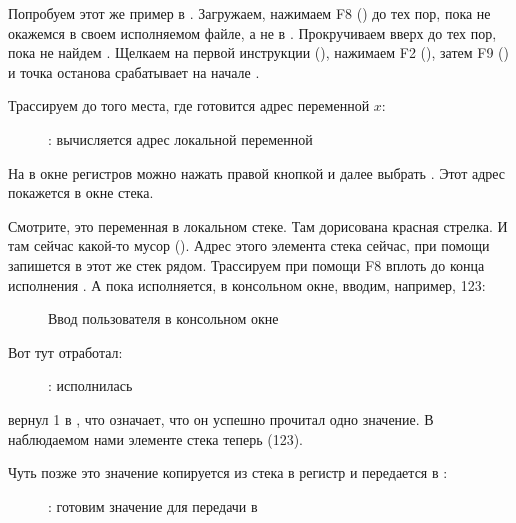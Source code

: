 \clearpage
{}
\myindex{\olly}

Попробуем этот же пример в \olly.
Загружаем, нажимаем F8 (\stepover) до тех пор, пока не окажемся в своем исполняемом файле,
а не в .
Прокручиваем вверх до тех пор, пока не найдем \main.
Щелкаем на первой инструкции (), нажимаем F2 (), 
затем F9 () и точка останова срабатывает на начале \main.

Трассируем до того места, где готовится адрес переменной $x$:

\begin{figure}[H]
\centering
{}
\caption{\olly: вычисляется адрес локальной переменной}
\label{fig:scanf_ex1_olly_1}
\end{figure}

На \EAX в окне регистров можно нажать правой кнопкой и далее выбрать .
Этот адрес покажется в окне стека.

Смотрите, это переменная в локальном стеке. Там дорисована красная стрелка.
И там сейчас какой-то мусор ().
Адрес этого элемента стека сейчас, при помощи \PUSH запишется в этот же стек рядом.
Трассируем при помощи F8 вплоть до конца исполнения \scanf.
А пока \scanf исполняется, в консольном окне, вводим, например, 123:

\begin{figure}[H]
\centering
{}
\caption{Ввод пользователя в консольном окне}
\label{fig:scanf_ex1_olly_2}
\end{figure}

\clearpage
Вот тут \scanf отработал:

\begin{figure}[H]
\centering
{}
\caption{\olly: \scanf исполнилась}
\label{fig:scanf_ex1_olly_3}
\end{figure}

\scanf вернул 1 в \EAX, что означает, что он успешно прочитал одно значение.
В наблюдаемом нами элементе стека теперь  (123).

\clearpage
Чуть позже это значение копируется из стека в регистр \ECX и передается в \printf{}:

\begin{figure}[H]
\centering
{}
\caption{\olly: готовим значение для передачи в \printf}
\label{fig:scanf_ex1_olly_4}
\end{figure}

